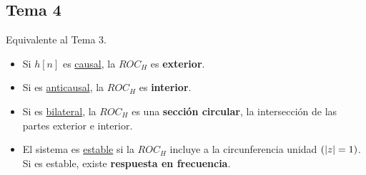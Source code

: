 \documentclass[a4paper]{book}
\begin{document}
\begin{landscape}
\begin{multicols}{4}
		\columnbreak
		\section*{Tema 4}
		Equivalente al Tema 3.
		\begin{itemize}
			\item Si $h[n]$ es \underline{causal}, la $ROC_H$ es \textbf{exterior}.
			\item Si es \underline{anticausal}, la $ROC_H$ es \textbf{interior}.
			\item Si es \underline{bilateral}, la $ROC_H$ es una \textbf{sección circular}, la intersección de las partes exterior e interior.
			\item El sistema es \underline{estable} si la $ROC_H$ incluye a la circunferencia unidad $\left( \abs{z} = 1 \right)$. Si es estable, existe \textbf{respuesta en frecuencia}.
		\end{itemize}
	\end{multicols}
\end{landscape}



% 
% 
\end{document}
